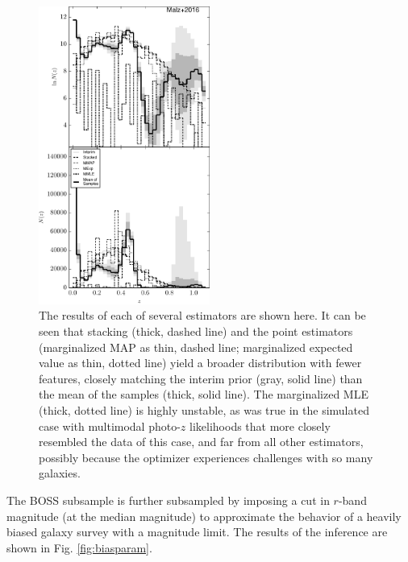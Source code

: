 \documentclass[preprint]{aastex}
\begin{document}
\begin{figure}
\includegraphics[width=0.5\textwidth]{figs/boss/comps.pdf}
\caption{The results of each of several estimators are shown here.  It can be 
seen that stacking (thick, dashed line) and the point estimators (marginalized 
MAP as thin, dashed line; marginalized expected value as thin, dotted line) 
yield a broader distribution with fewer features, closely matching the interim 
prior (gray, solid line) than the mean of the samples (thick, solid line).  The 
marginalized MLE (thick, dotted line) is highly unstable, as was true in the 
simulated case with multimodal photo-$z$ likelihoods that more closely 
resembled the data of this case, and far from all other estimators, possibly 
because the optimizer experiences challenges with so many galaxies.}
\label{fig:datacomp}
\end{figure}

The BOSS subsample is further subsampled by imposing a cut in $r$-band 
magnitude (at the median magnitude) to approximate the behavior of a heavily 
biased galaxy survey with a magnitude limit.  The results of the inference are 
shown in Fig. \ref{fig:biasparam}.
\end{document}
